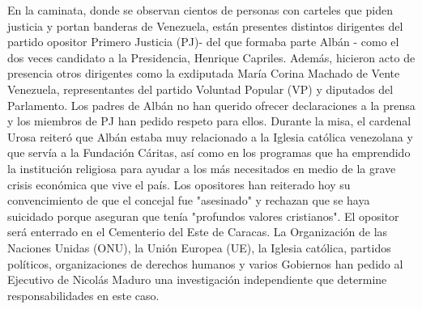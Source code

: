 \documentclass{article}%
\begin{document}
\newline%
%
En la caminata, donde se observan cientos de personas con carteles que piden justicia y portan banderas de Venezuela, están presentes distintos dirigentes del partido opositor Primero Justicia (PJ){-} del que formaba parte Albán {-} como el dos veces candidato a la Presidencia, Henrique Capriles.%
\newline%
%
Además, hicieron acto de presencia otros dirigentes como la exdiputada María Corina Machado de Vente Venezuela, representantes del partido Voluntad Popular (VP) y diputados del Parlamento.%
\newline%
%
Los padres de Albán no han querido ofrecer declaraciones a la prensa y los miembros de PJ han pedido respeto para ellos.%
\newline%
%
Durante la misa, el cardenal Urosa reiteró que Albán estaba muy relacionado a la Iglesia católica venezolana y que servía a la Fundación Cáritas, así como en los programas que ha emprendido la institución religiosa para ayudar a los más necesitados en medio de la grave crisis económica que vive el país.%
\newline%
%
Los opositores han reiterado hoy su convencimiento de que el concejal fue "asesinado" y rechazan que se haya suicidado porque aseguran que tenía "profundos valores cristianos".%
\newline%
%
El opositor será enterrado en el Cementerio del Este de Caracas.%
\newline%
%
La Organización de las Naciones Unidas (ONU), la Unión Europea (UE), la Iglesia católica, partidos políticos, organizaciones de derechos humanos y varios Gobiernos han pedido al Ejecutivo de Nicolás Maduro una investigación independiente que determine responsabilidades en este caso.%
\newline%
%
\end{document}
